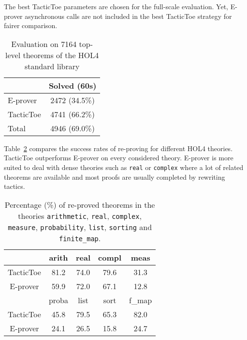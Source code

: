 \documentclass[runningheads,a4paper,draft]{svjour3}
\def\holfour{\textsf{HOL4}\xspace}
\def\eprover{\textsf{E-prover}\xspace}
\def\tactictoe{\textsf{TacticToe}\xspace}
\newcommand{\ra}[1]{\renewcommand{\arraystretch}{#1}}
\begin{document}
The best \tactictoe parameters are chosen for the full-scale evaluation. Yet,
\eprover asynchronous calls are not included in the best \tactictoe strategy 
for fairer comparison.


\begin{table}[h!]
\centering\ra{1.3}
\small
\begin{tabular}{lc}
\toprule
  & Solved (60s) \\
\midrule
   \eprover   & 2472 (34.5\%)\\ 
   \tactictoe & 4741 (66.2\%)\\
\midrule
   Total  & 4946 (69.0\%)\\
\bottomrule
\end{tabular}
\caption{Evaluation on 7164 top-level theorems of the \holfour standard library
\label{tab:_param}}
\end{table}

Table~\ref{theories} compares the success rates of re-proving for different
\holfour theories. \tactictoe outperforms \eprover on every
considered theory.
\eprover is more suited to deal with dense theories such as
\texttt{real} or \texttt{complex} where a lot of related theorems are available
and most proofs are usually completed by rewriting tactics.

\begin{table}[]
\centering
\setlength{\tabcolsep}{3mm}
\begin{tabular}{@{}ccccc@{}}
\toprule
\phantom{ab} & {arith} & {real} & {compl} & {meas} \\
\midrule
\tactictoe & 81.2 & 74.0 & 79.6 & 31.3\\
\eprover & 59.9 & 72.0 & 67.1 & 12.8\\
\midrule
\phantom{abc} & {proba} & {list} & {sort} & {f\_map} \\
\midrule
\tactictoe & 45.8 & 79.5 & 65.3 & 82.0 \\
\eprover & 24.1 & 26.5 & 15.8 & 24.7 \\
\bottomrule
\end{tabular}
\caption{\label{theories}Percentage (\%) of re-proved theorems in the theories
\texttt{arithmetic}, \texttt{real}, \texttt{complex}, \texttt{measure},
\texttt{probability}, \texttt{list}, \texttt{sorting} and \texttt{finite\_map}.
}
\end{table}



\end{document}
